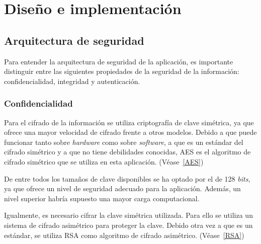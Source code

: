 
\chapter{Diseño e implementación} %

\label{Chapter4} %


\section{Arquitectura de seguridad}

Para entender la arquitectura de seguridad de la aplicación, es importante distinguir entre las siguientes propiedades de la seguridad de la información: confidencialidad, integridad y autenticación.

\subsection{Confidencialidad}

Para el cifrado de la información se utiliza criptografía de clave simétrica, ya que ofrece una mayor velocidad de cifrado frente a otros modelos. Debido a que puede funcionar tanto sobre \emph{hardware} como sobre \emph{software}, a que es un estándar del cifrado simétrico y a que no tiene debilidades conocidas, AES es el algoritmo de cifrado simétrico que se utiliza en esta aplicación. (Véase~\ref{AES})

De entre todos los tamaños de clave disponibles se ha optado por el de 128 \emph{bits}, ya que ofrece un nivel de seguridad adecuado para la aplicación. Además, un nivel superior habría supuesto una mayor carga computacional.

Igualmente, es necesario cifrar la clave simétrica utilizada. Para ello se utiliza un sistema de cifrado asimétrico para proteger la clave. Debido otra vez a que es un estándar, se utiliza RSA como algoritmo de cifrado asimétrico. (Véase~\ref{RSA})

